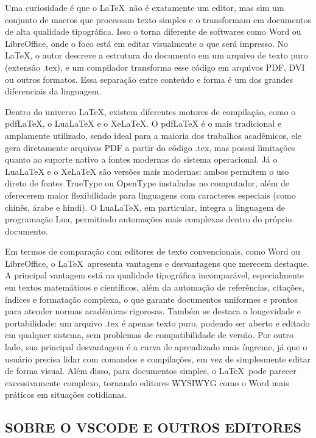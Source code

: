 Uma curiosidade é que o \LaTeX \ não é exatamente um editor, mas sim um conjunto de macros que processam texto simples e o transformam em documentos de alta qualidade tipográfica. Isso o torna diferente de softwares como Word ou LibreOffice, onde o foco está em editar visualmente o que será impresso. No \LaTeX , o autor descreve a estrutura do documento em um arquivo de texto puro (extensão .tex), e um compilador transforma esse código em arquivos PDF, DVI ou outros formatos. Essa separação entre conteúdo e forma é um dos grandes diferenciais da linguagem.

Dentro do universo \LaTeX, existem diferentes motores de compilação, como o pdfLaTeX, o LuaLaTeX e o XeLaTeX. O pdfLaTeX é o mais tradicional e amplamente utilizado, sendo ideal para a maioria dos trabalhos acadêmicos, ele gera diretamente arquivos PDF a partir do código .tex, mas possui limitações quanto ao suporte nativo a fontes modernas do sistema operacional. Já o LuaLaTeX e o XeLaTeX são versões mais modernas: ambos permitem o uso direto de fontes TrueType ou OpenType instaladas no computador, além de oferecerem maior flexibilidade para linguagens com caracteres especiais (como chinês, árabe e hindi). O LuaLaTeX, em particular, integra a linguagem de programação Lua, permitindo automações mais complexas dentro do próprio documento.

Em termos de comparação com editores de texto convencionais, como Word ou LibreOffice, o \LaTeX \ apresenta vantagens e desvantagens que merecem destaque. A principal vantagem está na qualidade tipográfica incomparável, especialmente em textos matemáticos e científicos, além da automação de referências, citações, índices e formatação complexa, o que garante documentos uniformes e prontos para atender normas acadêmicas rigorosas. Também se destaca a longevidade e portabilidade: um arquivo .tex é apenas texto puro, podendo ser aberto e editado em qualquer sistema, sem problemas de compatibilidade de versão. Por outro lado, sua principal desvantagem é a curva de aprendizado mais íngreme, já que o usuário precisa lidar com comandos e compilações, em vez de simplesmente editar de forma visual. Além disso, para documentos simples, o \LaTeX \ pode parecer excessivamente complexo, tornando editores WYSIWYG como o Word mais práticos em situações cotidianas.

\subsection{SOBRE O VSCODE E OUTROS EDITORES}


